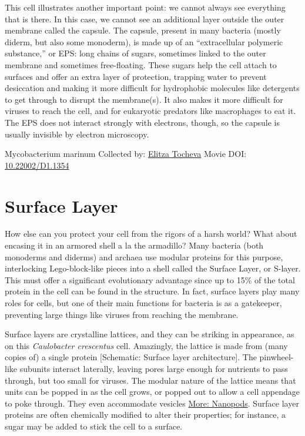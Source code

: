 \documentclass[]{tufte-book}
\begin{document}
This cell illustrates another important point: we cannot always see everything that is there. In this case, we cannot see an additional layer outside the outer membrane called the capsule. The capsule, present in many bacteria (mostly diderm, but also some monoderm), is made up of an ``extracellular polymeric substance,'' or EPS: long chains of sugars, sometimes linked to the outer membrane and sometimes free-floating. These sugars help the cell attach to surfaces and offer an extra layer of protection, trapping water to prevent desiccation and making it more difficult for hydrophobic molecules like detergents to get through to disrupt the membrane(s). It also makes it more difficult for viruses to reach the cell, and for eukaryotic predators like macrophages to eat it. The EPS does not interact strongly with electrons, though, so the capsule is usually invisible by electron microscopy.



\hypertarget{htmlwidget-54354a405f006cc3a248}{}

\label{fig:2-5}Mycobacterium marinum Collected by: \protect\hyperlink{elitza_tocheva}{Elitza Tocheva} Movie DOI: \href{https://doi.org/10.22002/D1.1354}{10.22002/D1.1354}

\hypertarget{surface-layer}{%
\section{Surface Layer}\label{surface-layer}}

How else can you protect your cell from the rigors of a harsh world? What about encasing it in an armored shell a la the armadillo? Many bacteria (both monoderms and diderms) and archaea use modular proteins for this purpose, interlocking Lego-block-like pieces into a shell called the Surface Layer, or S-layer. This must offer a significant evolutionary advantage since up to 15\% of the total protein in the cell can be found in the structure. In fact, surface layers play many roles for cells, but one of their main functions for bacteria is as a gatekeeper, preventing large things like viruses from reaching the membrane.

Surface layers are crystalline lattices, and they can be striking in appearance, as on this \emph{Caulobacter crescentus} cell. Amazingly, the lattice is made from (many copies of) a single protein {[}Schematic: Surface layer architecture{]}. The pinwheel-like subunits interact laterally, leaving pores large enough for nutrients to pass through, but too small for viruses. The modular nature of the lattice means that units can be popped in as the cell grows, or popped out to allow a cell appendage to poke through. They even accommodate vesicles \protect\hyperlink{Nanopods}{More: Nanopods}. Surface layer proteins are often chemically modified to alter their properties; for instance, a sugar may be added to stick the cell to a surface.
\end{document}

